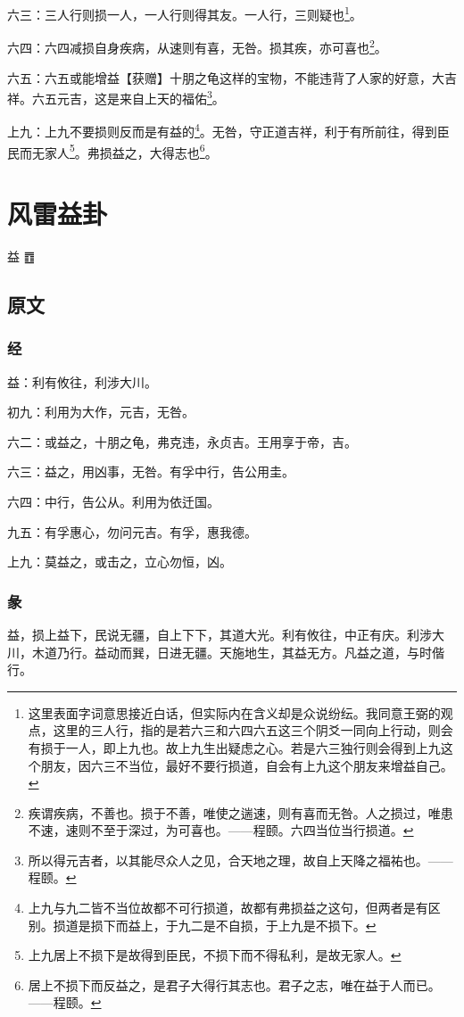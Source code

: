 \documentclass[12pt,oneside]{book}
\begin{document}
六三：三人行则损一人，一人行则得其友。一人行，三则疑也\footnote{这里表面字词意思接近白话，但实际内在含义却是众说纷纭。我同意王弼的观点，这里的三人行，指的是若六三和六四六五这三个阴爻一同向上行动，则会有损于一人，即上九也。故上九生出疑虑之心。若是六三独行则会得到上九这个朋友，因六三不当位，最好不要行损道，自会有上九这个朋友来增益自己。}。

六四：六四减损自身疾病，从速则有喜，无咎。损其疾，亦可喜也\footnote{疾谓疾病，不善也。损于不善，唯使之遄速，则有喜而无咎。人之损过，唯患不速，速则不至于深过，为可喜也。——程颐。六四当位当行损道。}。

六五：六五或能增益【获赠】十朋之龟这样的宝物，不能违背了人家的好意，大吉祥。六五元吉，这是来自上天的福佑\footnote{所以得元吉者，以其能尽众人之见，合天地之理，故自上天降之福祐也。——程颐。}。

上九：上九不要损则反而是有益的\footnote{上九与九二皆不当位故都不可行损道，故都有弗损益之这句，但两者是有区别。损道是损下而益上，于九二是不自损，于上九是不损下。}。无咎，守正道吉祥，利于有所前往，得到臣民而无家人\footnote{上九居上不损下是故得到臣民，不损下而不得私利，是故无家人。}。弗损益之，大得志也\footnote{居上不损下而反益之，是君子大得行其志也。君子之志，唯在益于人而已。 ——程颐。}。

\chapter{风雷益卦}
益 {\Large ䷩}
\section{原文}

\subsection{经}
益：利有攸往，利涉大川。

初九：利用为大作，元吉，无咎。

六二：或益之，十朋之龟，弗克违，永贞吉。王用享于帝，吉。

六三：益之，用凶事，无咎。有孚中行，告公用圭。

六四：中行，告公从。利用为依迁国。

九五：有孚惠心，勿问元吉。有孚，惠我德。

上九：莫益之，或击之，立心勿恒，凶。

\subsection{彖}
益，损上益下，民说无疆，自上下下，其道大光。利有攸往，中正有庆。利涉大川，木道乃行。益动而巽，日进无疆。天施地生，其益无方。凡益之道，与时偕行。
\end{document}
